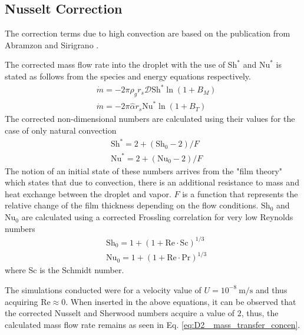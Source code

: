\documentclass[12pt]{article}
\numberwithin{equation}{section}
\begin{document}
\begin{appendices}
\subsection{Nusselt Correction}
The correction terms due to high convection are based on the publication from Abramzon and Sirigrano \cite{abramzon1989droplet}.

The corrected mass flow rate into the droplet with the use of $\mathrm{Sh}^*$ and $\mathrm{Nu}^*$ is stated as follows from the species and energy equations respectively.
\begin{equation}
    \begin{aligned}
        &\dot{m}=-2\pi\rho_{g}r_{s}\mathcal{D}\mathrm{Sh}^{*}\ln(1+B_{M})\\
        &\dot{m}=-2\pi \hat{\alpha}r_{s}\mathrm{Nu}^{*}\ln(1+B_{T})  
    \end{aligned}
\end{equation}
The corrected non-dimensional numbers are calculated using their values for the case of only natural convection
\begin{equation}
    \begin{aligned}
        &\mathrm{Sh}^{*}=2+(\mathrm{Sh}_{0}-2)/F\\
        &\mathrm{Nu}^{*}=2+(\mathrm{Nu}_{0}-2)/F 
    \end{aligned}
\end{equation}
The notion of an initial state of these numbers arrives from the "film theory" which states that due to convection, there is an additional resistance to mass and heat exchange between the droplet and vapor. $F$ is a function that represents the relative change of the film thickness depending on the flow conditions. $\mathrm{Sh}_{0}$ and $\mathrm{Nu}_{0}$ are calculated using a corrected Frossling correlation for very low Reynolds numbers
\begin{equation}
    \begin{aligned}
        &\mathrm{Sh}_{0}=1+(1+\mathrm{Re}\cdot\mathrm{Sc})^{1/3}\\
        &\mathrm{Nu}_{0}=1+(1+\mathrm{Re}\cdot\mathrm{Pr})^{1/3} 
    \end{aligned}
\end{equation}
where \textrm{Sc} is the Schmidt number. 

The simulations conducted were for a velocity value of $U=10^{-8}\:\mathrm{m/s}$ and thus acquiring $\mathrm{Re}\approx 0$. When inserted in the above equations, it can be observed that the corrected Nusselt and Sherwood numbers acquire a value of $2$, thus, the calculated mass flow rate remains as seen in Eq. \ref{eq:D2 _mass_transfer_concen}. 

\end{appendices}
\end{document}
